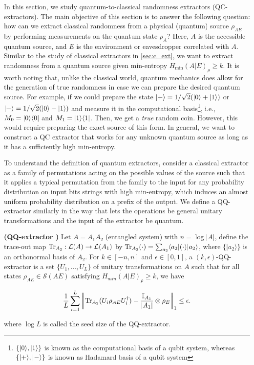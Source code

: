 In this section, we study quantum-to-classical randomness extractors (QC-extractors). The main objective of this section is to answer the following question: how can we extract classical randomness from a physical (quantum) source $\rho_{AE}$ by performing measurements on the quantum state $\rho_A$? Here, $A$ is the accessible quantum source, and $E$ is the environment or eavesdropper correlated with $A$. Similar to the study of classical extractors in \autoref{sec:c_ext}, we want to extract randomness from a quantum source given  min-entropy $H_{\min}(A|E)_\rho \geq k$. It is worth noting that, unlike the classical world, quantum mechanics does allow for the generation of true randomness in case we can prepare the desired quantum source. For example, if we could prepare the state $|+ \rangle = {1/\sqrt{2}}(|0 \rangle + |1 \rangle)$ or $|- \rangle = {1/\sqrt{2}}(|0 \rangle - |1 \rangle)$ and measure it in the computational basis\footnote{$\{|0 \rangle, |1 \rangle\}$ is known as the computational basis of a qubit system, whereas $\{|+ \rangle, |- \rangle\}$ is known as Hadamard basis of a qubit system}, i.e., $M_0 = |0 \rangle\langle 0|$ and $M_1 = |1 \rangle\langle 1|$. Then, we get a \textit{true} random coin. However, this would require preparing the exact source of this form. In general, we want to construct a QC extractor that works for any unknown quantum source as long as it has a sufficiently high min-entropy.

To understand the definition of quantum extractors, consider a classical extractor as a family of permutations acting on the possible values of the source such that it applies a typical permutation from the family to the input for any probability distribution on input bits strings with high min-entropy, which induces an almost uniform probability distribution on a prefix of the output. We define a QQ-extractor similarly in the way that lets the operations be general unitary transformations and the input of the extractor be quantum.

\begin{definition}\textbf{(QQ-extractor \cite{Berta_2014})} 
    Let $A = A_1A_2$ (entangled system) with $n = \log |A|$, define the trace-out map $\operatorname{Tr}_{A_2} : \mathcal{L}(A) \to \mathcal{L}(A_1)$ by $\operatorname{Tr}_{A_2}(\cdot) = \sum_{a_2} \langle a_{2}|(\cdot)|a_{2} \rangle$, where $\{|a_2 \rangle \}$ is an orthonormal basis of $A_2$. For $k \in [-n, n]$ and $\epsilon \in [0,1]$, a $(k, \epsilon)$-QQ-extractor is a set $\{U_1, \dots, U_L\}$ of unitary transformations on $A$ such that for all states $\rho_{AE} \in \mathcal{S}(AE)$ satisfying $H_{min}(A|E)_{\rho} \geq k$, we have 
    
    \begin{align*}
        \frac{1}{L} 
        \sum_{i = 1}^{L} 
        \left\|\operatorname{Tr}_{A_2}(U_{i} \rho_{AE} U_{i}^{\dagger}) - \frac{\mathbb{I}_{A_{1}}}{|A_{1}|} \otimes \rho_{E}\right\|_{1} \leq \epsilon. 
    \end{align*}
    
    where $\log L$ is called the seed size of the QQ-extractor.
\end{definition}

